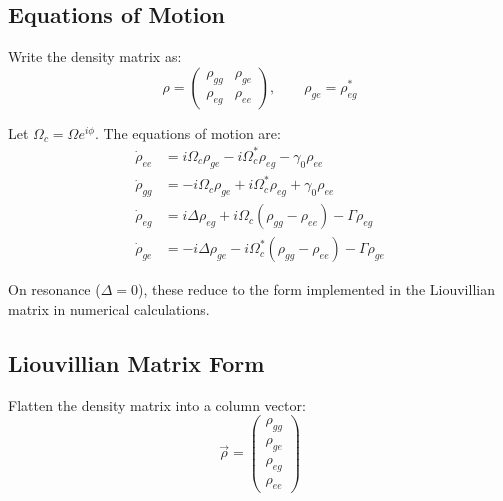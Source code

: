 \subsection{Equations of Motion}

Write the density matrix as:
\begin{equation}
	\rho = \begin{pmatrix}
		\rho_{gg} & \rho_{ge} \\
		\rho_{eg} & \rho_{ee}
	\end{pmatrix}, \qquad \rho_{ge} = \rho_{eg}^*
	\label{eq:DensityMatrixElements}
\end{equation}

Let \(\Omega_c = \Omega e^{i\phi}\). The equations of motion are:
\begin{equation}
	\boxed{
		\begin{aligned}
			\dot{\rho}_{ee} & = i \Omega_c \rho_{ge} - i \Omega_c^* \rho_{eg} - \gamma_0 \rho_{ee}            \\[6pt]
			\dot{\rho}_{gg} & = -i \Omega_c \rho_{ge} + i \Omega_c^* \rho_{eg} + \gamma_0 \rho_{ee}           \\[6pt]
			\dot{\rho}_{eg} & = i \Delta \rho_{eg} + i \Omega_c (\rho_{gg} - \rho_{ee}) - \Gamma \rho_{eg}    \\[6pt]
			\dot{\rho}_{ge} & = -i \Delta \rho_{ge} - i \Omega_c^* (\rho_{gg} - \rho_{ee}) - \Gamma \rho_{ge}
		\end{aligned}
	}
	\label{eq:BlochEquations}
\end{equation}

On resonance (\(\Delta = 0\)), these reduce to the form implemented in the Liouvillian matrix in numerical calculations.

\subsection{Liouvillian Matrix Form}

Flatten the density matrix into a column vector:
\begin{equation}
	\vec{\rho} =
	\begin{pmatrix}
		\rho_{gg} \\
		\rho_{ge} \\
		\rho_{eg} \\
		\rho_{ee}
	\end{pmatrix}
	\label{eq:DensityMatrixVector}
\end{equation}

